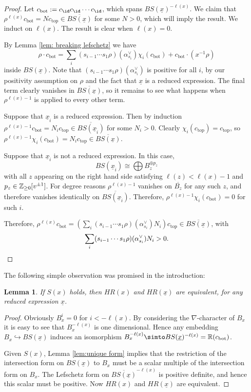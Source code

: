 \documentclass[11pt]{amsart}
\numberwithin{equation}{section}
\def\a{\alpha}
\def\top{{\mathrm{top}}}
\def\bot{{\mathrm{bot}}}
\def\ov{\overline}
\def\un{\underline}
\newtheorem{lem}[thm]{Lemma}
\theoremstyle{definition}
\theoremstyle{remark}
\begin{document}
\begin{proof} Let $c_{\bot} := c_{\id} c_{\id} \cdots c_{\id}$, which spans $BS(\un{x})^{-\ell(x)}$. We claim that $\rho^{\ell(x)} c_{\bot} = N c_{\top} \in \ov{BS(\un{x})}$ for some
$N>0$, which will imply the result. We induct on $\ell(x)$. The result is clear when $\ell(x)=0$.

By Lemma \ref{lem: breaking lefschetz} we have
\[ \rho \cdot c_{\bot} =
\sum_i (s_{i-1} \cdots s_1 \rho )(\a_{s_i}^\vee) \chi_i(c_{\bot}) +
c_{\bot} \cdot (x^{-1} \rho) \] inside $BS(\un{x})$.
Note that $(s_{i-1} \cdots s_1 \rho )(\a_{s_i}^\vee)$ is positive for all $i$,
by our positivity assumption on $\rho$ and the fact that $\un{x}$ is a
reduced expression. The final term clearly vanishes in $\ov{BS(\un{x})}$, so it remains to see what happens when $\rho^{\ell(x)-1}$ is applied to every other term.

Suppose that $\un{x}_{\widehat{i}}$ is a reduced expression. Then by induction $\rho^{\ell(x)-1} c_{\bot} = N_i c_{\top} \in \ov{BS(\un{x}_{\widehat{i}})}$ for some $N_i>0$. Clearly
$\chi_i(c_{\top})=c_{\top}$, so $\rho^{\ell(x)-1} \chi_i(c_{\bot}) = N_i c_{\top} \in \ov{BS(\un{x})}$.

Suppose that $\un{x}_{\widehat{i}}$ is not a reduced expression. In
this case,
\[
BS(\un{x}_{\widehat{i}}) \cong \bigoplus B_z^{\oplus p_z}
\]
with all $z$ appearing on the right hand side satisfying
$\ell(z)<\ell(x)-1$ and $p_z \in {\mathbb{Z}}_{\ge 0}[v^{\pm 1}]$. For 
degree reasons $\rho^{\ell(x)-1}$ vanishes on $\ov{B_z}$ for any such
$z$, and therefore vanishes identically on
$\ov{BS(\un{x}_{\widehat{i}})}$. Therefore, $\rho^{\ell(x)-1} 
\chi_i(c_{\bot}) = 0$ for such $i$.

Therefore, $\rho^{\ell(x)} c_{\bot} = \left (\sum_i (s_{i-1} \cdots s_1 \rho
)(\a_{s_i}^\vee) N_i \right )  c_{\top} \in \ov{BS(\un{x})}$, with 
\[
\sum_i (s_{i-1} \cdots s_1 \rho )(\a_{s_i}^\vee) N_i > 0. \qedhere
\] \end{proof}

The following simple observation was promised in the introduction:

\begin{lem} \label{lem:HRembedding} If $S(x)$ holds, then $HR(x)$ and $HR(\un{x})$ are equivalent, for any reduced expression $\un{x}$. \end{lem}

\begin{proof} 	Obviously $B_x^i = 0$ for $i < -\ell(x)$. By considering
  the $\nabla$-character of $B_x$ it is easy to see that 
  $B_x^{-\ell(x)}$ is one dimensional. Hence any embedding $B_x \hookrightarrow
  BS(\un{x})$ induces an isomorphism $B_x^{-\ell(x)} \simto
  BS(\un{x})^{-\ell(x)} = \RM( c_{\bot})$.
	
	Given $S(x)$, Lemma \ref{lem:unique form} implies that the restriction of the intersection form on $BS(\un{x})$ to $B_x$ must be a scalar multiple of the intersection form on $B_x$. The Lefschetz form on $\ov{BS(\un{x})}^{-\ell(x)}$ is positive definite, and hence this scalar must be positive. Now $HR(x)$ and $HR(\un{x})$ are equivalent. \end{proof}
	
\end{document}
